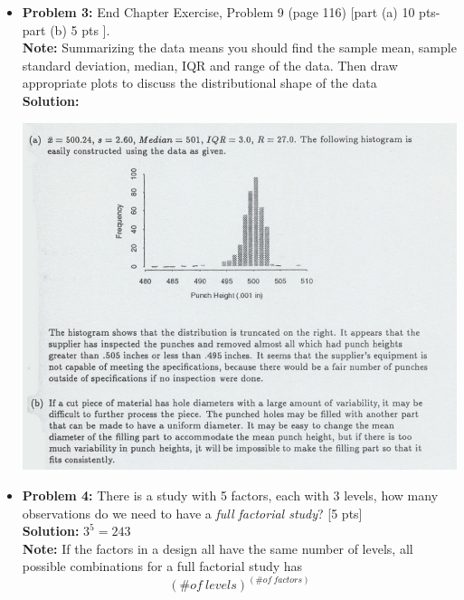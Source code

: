 \documentclass[11pt]{article}\usepackage[]{graphicx}\usepackage[]{color}
\begin{document}
\begin{itemize}
\item \textbf{Problem 3:}   End Chapter Exercise, Problem 9 (page 116)  [part (a) 10 pts- part (b) 5 pts ]. \\
\textbf{Note:} Summarizing the data means you should find the sample mean, sample standard deviation, median, IQR and range of the data. Then draw appropriate plots to discuss the distributional shape of the data\\
 \textbf{Solution:}\\
 \begin{center}
 	\begin{minipage}{\linewidth}
 		\centering
 		\includegraphics[width=\textwidth]{hw3p3.png}
 	\end{minipage}
 \end{center}

\item \textbf{Problem 4:} There is a study with 5 factors, each with 3 levels, how many observations do we need to have a \textit{ full factorial study}? [5 pts]\\
\textbf{Solution:}
$3^{5}= 243$\\

 \textbf{Note:} If the factors in a design all have the same number of levels, all possible combinations for a full factorial study has $$(\# of\  levels )^{(\# of\  factors)}$$


\end{itemize}
\end{document}
